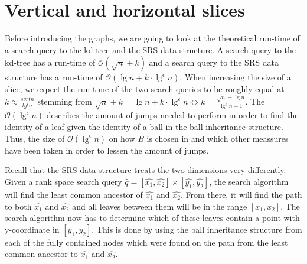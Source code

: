 \section{Vertical and horizontal slices}

Before introducing the graphs, we are going to look at the theoretical run-time of a search query to the kd-tree and the SRS data structure. A search query to the kd-tree has a run-time of $\mathcal{O}(\sqrt{n}+k)$ and a search query to the SRS data structure has a run-time of $\mathcal{O}(\lg n + k \cdot \lg^\epsilon n)$. When increasing the size of a slice, we expect the run-time of the two search queries to be roughly equal at $k \approx \frac{sqrt{n}}{lg^\epsilon n}$ stemming from $\sqrt{n} + k = \lg n + k \cdot \lg^\epsilon n \Leftrightarrow k = \frac{\sqrt{n} - \lg n}{\lg^\epsilon n - 1}$. The $\mathcal{O}(\lg^\epsilon n)$ describes the amount of jumps needed to perform in order to find the identity of a leaf given the identity of a ball in the ball inheritance structure. Thus, the size of $\mathcal{O}(\lg^\epsilon n)$ on how $B$ is chosen in  and which other meassures have been taken in order to lessen the amount of jumps. 

Recall that the SRS data structure treats the two dimensions very differently. Given a rank space search query $\hat{q} = [\hat{x_1}, \hat{x_2}] \times [\hat{y_1}, \hat{y_2}]$, the search algorithm will find the least common ancestor of $\hat{x_1}$ and $\hat{x_2}$. From there, it will find the path to both $\hat{x_1}$ and $\hat{x_2}$ and all leaves between them will be in the range $[x_1, x_2]$. The search algorithm now has to determine which of these leaves contain a point with y-coordinate in $[y_1, y_2]$. This is done by using the ball inheritance structure from each of the fully contained nodes which were found on the path from the least common ancestor to $\hat{x_1}$ and $\hat{x_2}$.

